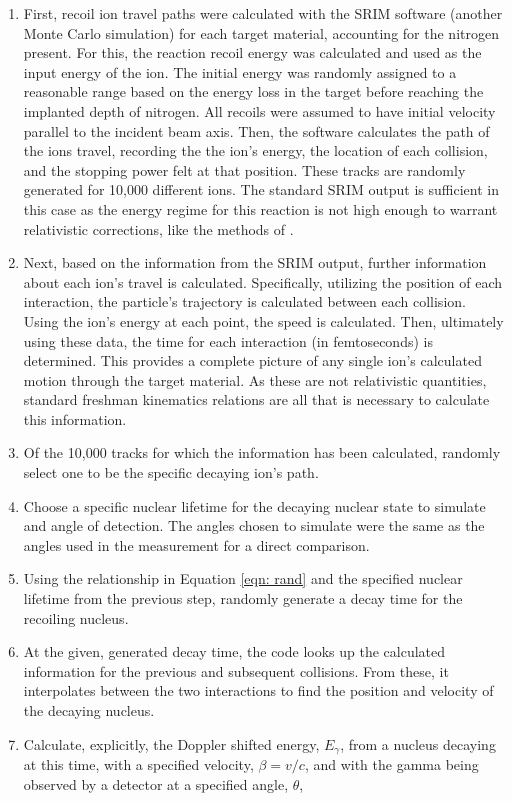 \begin{enumerate}
\item First, recoil ion travel paths were calculated with the SRIM software \cite{Ziegler2010} (another Monte Carlo simulation) for each target material, accounting for the nitrogen present. For this, the reaction recoil energy was calculated and used as the input energy of the ion. The initial energy was randomly assigned to a reasonable range based on the energy loss in the target before reaching the implanted depth of nitrogen. All recoils were assumed to have initial velocity parallel to the incident beam axis. Then, the software calculates the path of the ions travel, recording the the ion's energy, the location of each collision, and the stopping power felt at that position. These tracks are randomly generated for 10,000 different ions. The standard SRIM output is sufficient in this case as the energy regime for this reaction is not high enough to warrant relativistic corrections, like the methods of \cite{Galinski2014, Michelagnoli2013}. 
\item Next, based on the information from the SRIM output, further information about each ion's travel is calculated. Specifically, utilizing the position of each interaction, the particle's trajectory is calculated between each collision. Using the ion's energy at each point, the speed is calculated. Then, ultimately using these data, the time for each interaction (in femtoseconds) is determined. This provides a complete picture of any single ion's calculated motion through the target material. As these are not relativistic quantities, standard freshman kinematics relations are all that is necessary to calculate this information.
\item Of the 10,000 tracks for which the information has been calculated, randomly select one to be the specific decaying ion's path. 
\item Choose a specific nuclear lifetime for the decaying nuclear state to simulate and angle of detection. The angles chosen to simulate were the same as the angles used in the measurement for a direct comparison. 
\item Using the relationship in Equation \ref{eqn: rand} and the specified nuclear lifetime from the previous step, randomly generate a decay time for the recoiling nucleus.  
\item At the given, generated decay time, the code looks up the calculated information for the previous and subsequent collisions. From these, it interpolates between the two interactions to find the position and velocity of the decaying nucleus. 
\item Calculate, explicitly, the Doppler shifted energy, $E_{\gamma}$, from a nucleus decaying at this time, with a specified velocity, $\beta = v/c$, and with the gamma being observed by a detector at a specified angle, $\theta$,


\end{enumerate}
